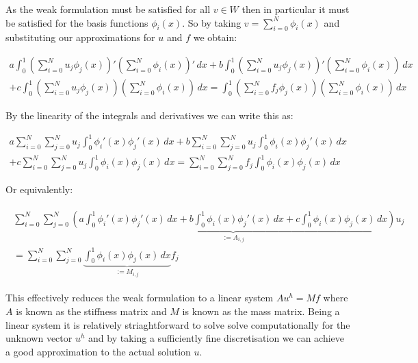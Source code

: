 As the weak formulation  must be satisfied for all $v \in W$ then in particular it
must be satisfied for the basis functions $\phi_i(x)$. So by taking $v = \sum_{i = 0}^N\phi_i(x)$ and 
substituting our approximations for $u$ and $f$ we obtain:

\begin{align*}
	a\int_0^1{\left(\sum_{i = 0}^N{u_j\phi_j(x)}\right)'\left(\sum_{i = 0}^N\phi_i(x)\right)'\, dx}
    +b\int_0^1{\left(\sum_{i = 0}^N{u_j\phi_j(x)}\right)'\left(\sum_{i = 0}^N\phi_i(x)\right)\, dx} \\
    +c\int_0^1{\left(\sum_{i = 0}^N{u_j\phi_j(x)}\right)\left(\sum_{i = 0}^N\phi_i(x)\right)\, dx} =
    \int_0^1{\left(\sum_{i = 0}^Nf_j\phi_j(x)\right)\left(\sum_{i = 0}^N\phi_i(x)\right)\, dx}
\end{align*}

By the linearity of the integrals and derivatives we can write this as:

\begin{align*}
	a\sum_{i = 0}^N\sum_{j = 0}^Nu_j\int_0^1\phi_i'(x)\phi_j'(x)\, dx
    +b\sum_{i = 0}^N\sum_{j = 0}^Nu_j\int_0^1\phi_i(x)\phi_j'(x)\, dx \\
    +c\sum_{i = 0}^N\sum_{j = 0}^Nu_j\int_0^1\phi_i(x)\phi_j(x)\, dx =
    \sum_{i = 0}^N\sum_{j = 0}^Nf_j\int_0^1\phi_i(x)\phi_j(x)\, dx
\end{align*}

Or equivalently:

\begin{align}\label{eq:oned-deterministic-discrete}
  \begin{split}
	\sum_{i = 0}^N\sum_{j = 0}^N\underbrace{\left(a\int_0^1\phi_i'(x)\phi_j'(x)\, dx
    + b\int_0^1\phi_i(x)\phi_j'(x)\, dx + c\int_0^1\phi_i(x)\phi_j(x)\, dx\right)}_{:= A_{i,j}}u_j  \\ 
    = \sum_{i= 0}^N\sum_{j = 0}^N\underbrace{\int_0^1{\phi_i(x)\phi_j(x)}\, dx}_{:= M_{i,j}}f_j
  \end{split}
\end{align}

This effectively reduces the weak formulation  to a linear system $Au^h = Mf$
where $A$ is known as the stiffness matrix and $M$ is known as the mass matrix. Being a linear system it is
relatively striaghtforward to solve solve computationally for the unknown vector $u^h$ and by taking a sufficiently 
fine discretisation we can achieve a good approximation to the actual solution $u$.

